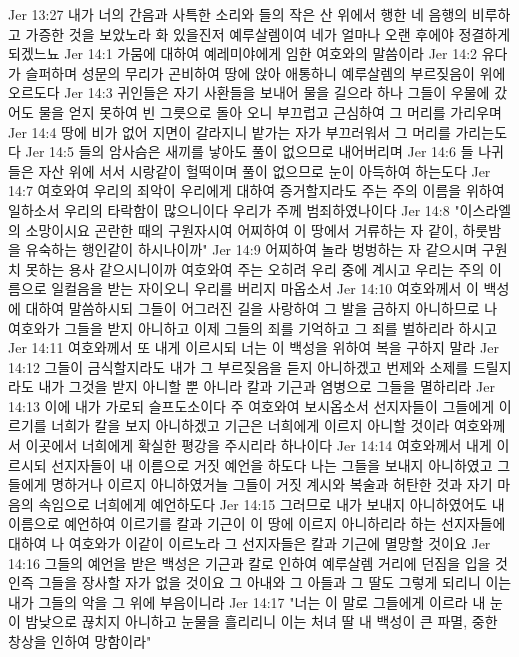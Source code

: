 Jer 13:27  내가 너의 간음과 사특한 소리와 들의 작은 산 위에서 행한 네 음행의 비루하고 가증한 것을 보았노라 화 있을진저 예루살렘이여 네가 얼마나 오랜 후에야 정결하게 되겠느뇨
Jer 14:1  가뭄에 대하여 예레미야에게 임한 여호와의 말씀이라
Jer 14:2  유다가 슬퍼하며 성문의 무리가 곤비하여 땅에 앉아 애통하니 예루살렘의 부르짖음이 위에 오르도다
Jer 14:3  귀인들은 자기 사환들을 보내어 물을 길으라 하나 그들이 우물에 갔어도 물을 얻지 못하여 빈 그릇으로 돌아 오니 부끄럽고 근심하여 그 머리를 가리우며
Jer 14:4  땅에 비가 없어 지면이 갈라지니 밭가는 자가 부끄러워서 그 머리를 가리는도다
Jer 14:5  들의 암사슴은 새끼를 낳아도 풀이 없으므로 내어버리며
Jer 14:6  들 나귀들은 자산 위에 서서 시랑같이 헐떡이며 풀이 없으므로 눈이 아득하여 하는도다
Jer 14:7  여호와여 우리의 죄악이 우리에게 대하여 증거할지라도 주는 주의 이름을 위하여 일하소서 우리의 타락함이 많으니이다 우리가 주께 범죄하였나이다
Jer 14:8  "이스라엘의 소망이시요 곤란한 때의 구원자시여 어찌하여 이 땅에서 거류하는 자 같이, 하룻밤을 유숙하는 행인같이 하시나이까"
Jer 14:9  어찌하여 놀라 벙벙하는 자 같으시며 구원치 못하는 용사 같으시니이까 여호와여 주는 오히려 우리 중에 계시고 우리는 주의 이름으로 일컬음을 받는 자이오니 우리를 버리지 마옵소서
Jer 14:10  여호와께서 이 백성에 대하여 말씀하시되 그들이 어그러진 길을 사랑하여 그 발을 금하지 아니하므로 나 여호와가 그들을 받지 아니하고 이제 그들의 죄를 기억하고 그 죄를 벌하리라 하시고
Jer 14:11  여호와께서 또 내게 이르시되 너는 이 백성을 위하여 복을 구하지 말라
Jer 14:12  그들이 금식할지라도 내가 그 부르짖음을 듣지 아니하겠고 번제와 소제를 드릴지라도 내가 그것을 받지 아니할 뿐 아니라 칼과 기근과 염병으로 그들을 멸하리라
Jer 14:13  이에 내가 가로되 슬프도소이다 주 여호와여 보시옵소서 선지자들이 그들에게 이르기를 너희가 칼을 보지 아니하겠고 기근은 너희에게 이르지 아니할 것이라 여호와께서 이곳에서 너희에게 확실한 평강을 주시리라 하나이다
Jer 14:14  여호와께서 내게 이르시되 선지자들이 내 이름으로 거짓 예언을 하도다 나는 그들을 보내지 아니하였고 그들에게 명하거나 이르지 아니하였거늘 그들이 거짓 계시와 복술과 허탄한 것과 자기 마음의 속임으로 너희에게 예언하도다
Jer 14:15  그러므로 내가 보내지 아니하였어도 내 이름으로 예언하여 이르기를 칼과 기근이 이 땅에 이르지 아니하리라 하는 선지자들에 대하여 나 여호와가 이같이 이르노라 그 선지자들은 칼과 기근에 멸망할 것이요
Jer 14:16  그들의 예언을 받은 백성은 기근과 칼로 인하여 예루살렘 거리에 던짐을 입을 것인즉 그들을 장사할 자가 없을 것이요 그 아내와 그 아들과 그 딸도 그렇게 되리니 이는 내가 그들의 악을 그 위에 부음이니라
Jer 14:17  "너는 이 말로 그들에게 이르라 내 눈이 밤낮으로 끊치지 아니하고 눈물을 흘리리니 이는 처녀 딸 내 백성이 큰 파멸, 중한 창상을 인하여 망함이라"
